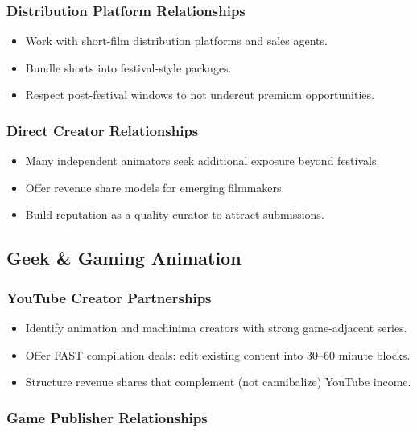 \documentclass[12pt,letterpaper,twoside]{report}
\begin{document}
\subsubsection{Distribution Platform Relationships}

\begin{itemize}[leftmargin=1.5cm]
    \item Work with short-film distribution platforms and sales agents.
    \item Bundle shorts into festival-style packages.
    \item Respect post-festival windows to not undercut premium opportunities.
\end{itemize}

\subsubsection{Direct Creator Relationships}

\begin{itemize}[leftmargin=1.5cm]
    \item Many independent animators seek additional exposure beyond festivals.
    \item Offer revenue share models for emerging filmmakers.
    \item Build reputation as a quality curator to attract submissions.
\end{itemize}

\subsection{Geek \& Gaming Animation}

\subsubsection{YouTube Creator Partnerships}

\begin{itemize}[leftmargin=1.5cm]
    \item Identify animation and machinima creators with strong game-adjacent series.
    \item Offer FAST compilation deals: edit existing content into 30--60 minute blocks.
    \item Structure revenue shares that complement (not cannibalize) YouTube income.
\end{itemize}

\subsubsection{Game Publisher Relationships}
\end{document}
